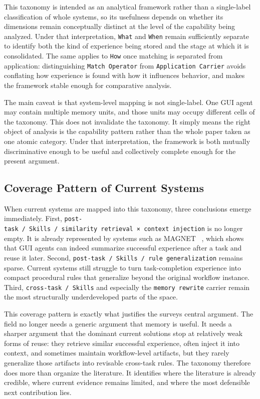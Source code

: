 \documentclass{article}
\begin{document}
This taxonomy is intended as an analytical framework rather than a
single-label classification of whole systems, so its usefulness depends
on whether its dimensions remain conceptually distinct at the level of
the capability being analyzed. Under that interpretation, \texttt{What}
and \texttt{When} remain sufficiently separate to identify both the kind
of experience being stored and the stage at which it is consolidated.
The same applies to \texttt{How} once matching is separated from
application: distinguishing \texttt{Match\ Operator} from
\texttt{Application\ Carrier} avoids conflating how experience is found
with how it influences behavior, and makes the framework stable enough
for comparative analysis.

The main caveat is that system-level mapping is not single-label. One
GUI agent may contain multiple memory units, and those units may occupy
different cells of the taxonomy. This does not invalidate the taxonomy.
It simply means the right object of analysis is the capability pattern
rather than the whole paper taken as one atomic category. Under that
interpretation, the framework is both mutually discriminative enough to
be useful and collectively complete enough for the present argument.

\subsection{Coverage Pattern of Current
Systems}\label{45-coverage-pattern-of-current-systems}

When current systems are mapped into this taxonomy, three conclusions
emerge immediately. First,
\texttt{post-task\ /\ Skills\ /\ similarity\ retrieval\ ×\ context\ injection}
is no longer empty. It is already represented by systems such as MAGNET
~\parencite{sun2026magnet}, which shows that GUI agents can indeed summarize
successful experience after a task and reuse it later. Second,
\texttt{post-task\ /\ Skills\ /\ rule\ generalization} remains sparse.
Current systems still struggle to turn task-completion experience into
compact procedural rules that generalize beyond the original workflow
instance. Third, \texttt{cross-task\ /\ Skills} and especially the
\texttt{memory\ rewrite} carrier remain the most structurally
underdeveloped parts of the space.

This coverage pattern is exactly what justifies the
survey\textquotesingle s central argument. The field no longer needs a
generic argument that memory is useful. It needs a sharper argument that
the dominant current solutions stop at relatively weak forms of reuse:
they retrieve similar successful experience, often inject it into
context, and sometimes maintain workflow-level artifacts, but they
rarely generalize those artifacts into revisable cross-task rules. The
taxonomy therefore does more than organize the literature. It identifies
where the literature is already credible, where current evidence remains
limited, and where the most defensible next contribution lies.
\end{document}
